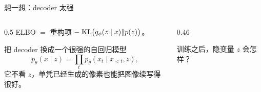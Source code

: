 \documentclass[aspectratio=169,10pt,UTF8,fontset=none]{ctexbeamer}
\begin{document}
\begin{frame}{想一想：decoder 太强}
  \begin{columns}[c]
    \begin{column}{0.5\textwidth}
      ELBO $=$ 重构项 $-\;\mathrm{KL}\bigl(q_\phi(z\mid x)\Vert p(z)\bigr)$。
      \vspace{3mm}

      把 decoder 换成一个很强的自回归模型
      \[
        p_\theta(x\mid z)=\textstyle\prod_t p_\theta(x_t\mid x_{<t},z),
      \]
      它不看 $z$，单凭已经生成的像素也能把图像续写得很好。
    \end{column}
    \begin{column}{0.46\textwidth}
      \begin{hook}
        训练之后，隐变量 $z$ 会怎样？
        \par\medskip
      \end{hook}
    \end{column}
  \end{columns}
\end{frame}
\end{document}
